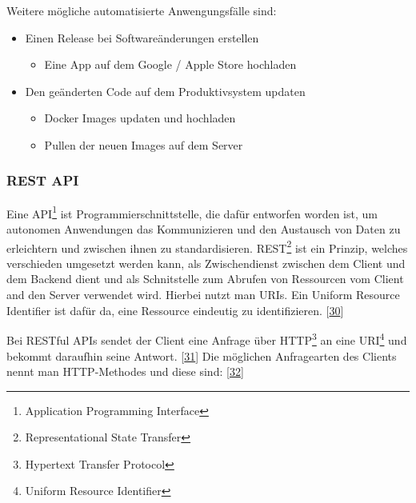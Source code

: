 \documentclass[
    headings=optiontotocandhead,%
    twoside,
    numbers=noenddot,%
    12pt, %
    titlepage, %
    parskip=full, %
    listof=leveldown, 
    numbers=noenddot, %
    a4paper,DIV=14,
    BCOR=15mm,
]{scrbook}
\providecommand{\tightlist}{%
  \setlength{\itemsep}{0pt}\setlength{\parskip}{0pt}}
\begin{document}
Weitere mögliche automatisierte Anwengungsfälle sind:

\begin{itemize}
\tightlist
\item
  Einen Release bei Softwareänderungen erstellen

  \begin{itemize}
  \tightlist
  \item
    Eine App auf dem Google / Apple Store hochladen
  \end{itemize}
\item
  Den geänderten Code auf dem Produktivsystem updaten

  \begin{itemize}
  \tightlist
  \item
    Docker Images updaten und hochladen
  \item
    Pullen der neuen Images auf dem Server
  \end{itemize}
\end{itemize}

\hypertarget{rest-api}{%
\subsubsection{REST API}\label{rest-api}}

Eine API\footnote{Application Programming Interface} ist
Programmierschnittstelle, die dafür entworfen worden ist, um autonomen
Anwendungen das Kommunizieren und den Austausch von Daten zu erleichtern
und zwischen ihnen zu standardisieren. REST\footnote{Representational
  State Transfer} ist ein Prinzip, welches verschieden umgesetzt werden
kann, als Zwischendienst zwischen dem Client und dem Backend dient und
als Schnitstelle zum Abrufen von Ressourcen vom Client and den Server
verwendet wird. Hierbei nutzt man URIs. Ein Uniform Resource Identifier
ist dafür da, eine Ressource eindeutig zu identifizieren.
{[}\protect\hyperlink{ref-REST-API-Design-Rulebook}{30}{]}

Bei RESTful APIs sendet der Client eine Anfrage über HTTP\footnote{Hypertext
  Transfer Protocol} an eine URI\footnote{Uniform Resource Identifier}
und bekommt daraufhin seine Antwort.
{[}\protect\hyperlink{ref-redhat-rest}{31}{]} Die möglichen Anfragearten
des Clients nennt man HTTP-Methodes und diese sind:
{[}\protect\hyperlink{ref-mozilla-rest}{32}{]}
\end{document}
